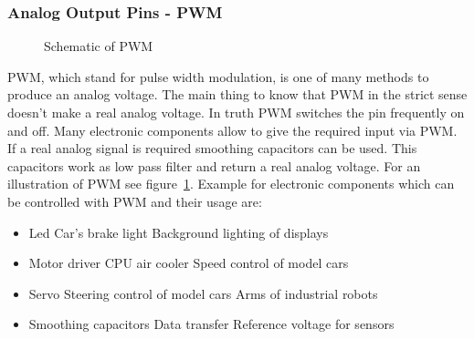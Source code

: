 \subsubsection{Analog Output Pins - PWM}\label{sec:analogOutputPinsPWM}
\begin{figure}
\caption{Schematic of PWM}
\label{fig:pwm}
\end{figure}


PWM, which stand for pulse width modulation, is one of many methods to produce an analog voltage.
The main thing to know that PWM in the strict sense doesn't make a real analog voltage.
In truth PWM switches the pin frequently on and off. 
Many electronic components allow to give the required input via PWM.
If a real analog signal is required smoothing capacitors can be used.
This capacitors work as low pass filter and return a real analog voltage.
For an illustration of PWM see figure~\ref{fig:pwm}. 
Example for electronic components which can be controlled with PWM and their usage are:
\begin{itemize}
\item Led
	\subitem Car's brake light
	\subitem Background lighting of displays
\item Motor driver
	\subitem CPU air cooler
	\subitem Speed control of model cars
\item Servo
	\subitem Steering control of model cars
	\subitem Arms of industrial robots
\item Smoothing capacitors
	\subitem Data transfer
	\subitem Reference voltage for sensors

\end{itemize}

